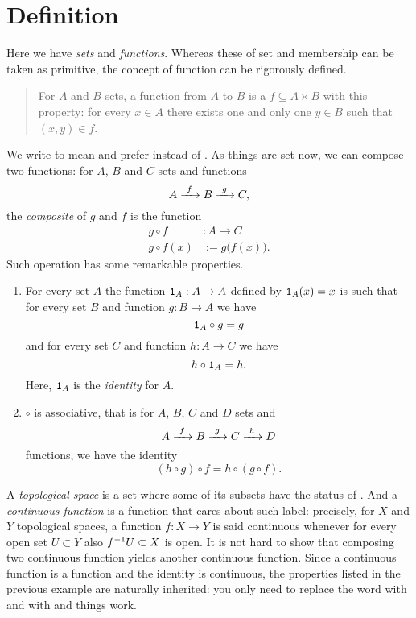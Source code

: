 
\section{Definition}

\begin{example}
Here we have {\em sets} and {\em functions}. Whereas these of set and membership can be taken as primitive, the concept of function can be rigorously defined.
\begin{quotation}
For \(A\) and \(B\) sets, a function from \(A\) to \(B\) is a \(f \subseteq A \times B\) with this property: for every \(x \in A\) there exists one and only one \(y \in B\) such that \((x, y ) \in f\).
\end{quotation}
We write  to mean  and prefer  instead of . As things are set now, we can compose two functions: for \(A\), \(B\) and \(C\) sets and  functions
\[A \xrightarrow{\ f\ } B \xrightarrow{\ g\ } C ,\]
the {\em composite} of \(g\) and \(f\) is the function
\begin{align*}
g \circ f &: A \to C \\
g \circ f(x) &:= g\big(f(x)\big) .
\end{align*}
Such operation has some remarkable properties.
\begin{enumerate}
\item For every set \(A\) the function \(\mathtt 1_A : A \to A\) defined by \(\mathtt 1_A(x) = x\) is such that for every set \(B\) and function \(g : B \to A\) we have
\[\mathtt 1_A \circ g = g\]
and for every set \(C\) and function \(h : A \to C\) we have
\[h \circ \mathtt 1_A = h .\]
Here, \(\mathtt 1_A\) is the {\em identity} for \(A\).
\item \(\circ\) is associative, that is for \(A\), \(B\), \(C\) and \(D\) sets and
\[A \xrightarrow{\ f\ } B \xrightarrow{\ g\ } C \xrightarrow{\ h\ } D\]
functions, we have the identity
\[(h \circ g) \circ f = h \circ (g \circ f) .\]
\end{enumerate}
\end{example}

\begin{example}[Topology]
A {\em topological space} is a set where some of its subsets have the status of . And a {\em continuous function} is a function that cares about such label: precisely, for \(X\) and \(Y\) topological spaces, a function \(f : X \to Y\) is said continuous whenever for every open set \(U \subset Y\) also \(f^{-1} U \subset X\) is open. It is not hard to show that composing two continuous function yields another continuous function. Since a continuous function is a function and the identity is continuous, the properties listed in the previous example are naturally inherited: you only need to replace the word  with  and  with  and things work.
\end{example}

